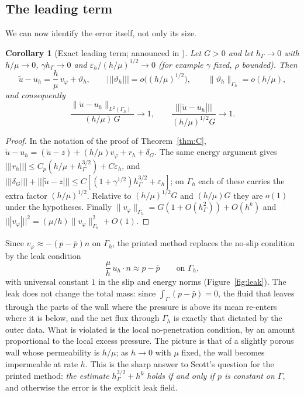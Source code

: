 \documentclass[pdflatex,sn-mathphys-num]{sn-jnl}
\theoremstyle{thmstyleone}
\newtheorem{corollary}[theorem]{Corollary}
\theoremstyle{thmstylethree}
\newcommand{\hG}{h_\Gamma}
\newcommand{\Gh}{\Gamma_h}
\newcommand{\ut}{\tilde u}
\newcommand{\pbar}{\bar p}
\newcommand{\tnorm}[1]{|\!|\!|#1|\!|\!|}
\newcommand{\norm}[1]{\lVert #1\rVert}
\newcommand{\eps}{\varepsilon_h}
\begin{document}
\subsection{The leading term}
We can now identify the error itself, not only its size.

\begin{corollary}[Exact leading term; announced in {\cite{CavalcantePadhiLetter}}]\label{cor:Bp}
Let $G>0$ and let $\hG\to0$ with $h/\mu\to0$, $\gamma\hG\to0$ and $\eps/(h/\mu)^{1/2}\to0$ (for example $\gamma$ fixed, $\rho$ bounded). Then
\[
\ut-u_h=\frac h\mu\,v_\varphi+\vartheta_h,\qquad \tnorm{\vartheta_h}=o\bigl((h/\mu)^{1/2}\bigr),\qquad \norm{\vartheta_h}_{\Gh}=o(h/\mu),
\]
and consequently
\[
\frac{\norm{\ut-u_h}_{L^2(\Gh)}}{(h/\mu)\,G}\longrightarrow1,\qquad\frac{\tnorm{\ut-u_h}}{(h/\mu)^{1/2}G}\longrightarrow1 .
\]
\end{corollary}

\begin{proof}
In the notation of the proof of Theorem~\ref{thm:C}, $\ut-u_h=(\ut-z)+(h/\mu)v_\varphi+r_h+\delta_G$. The same energy argument gives $\tnorm{r_h}\le C_p(h/\mu+\hG^{3/2})+C\eps$, and $\tnorm{\delta_G}+\tnorm{\ut-z}\le C[(1+\gamma^{1/2})\hG^{3/2}+\eps]$; on $\Gh$ each of these carries the extra factor $(h/\mu)^{1/2}$. Relative to $(h/\mu)^{1/2}G$ and $(h/\mu)G$ they are $o(1)$ under the hypotheses. Finally $\norm{v_\varphi}_{\Gh}=G(1+O(\hG^2))+O(h^k)$ and $\tnorm{v_\varphi}^2=(\mu/h)\norm{v_\varphi}^2_{\Gh}+O(1)$.
\end{proof}

Since $v_\varphi\approx-(p-\pbar)n$ on $\Gh$, the printed method replaces the no-slip condition by the leak condition
\[
\frac\mu h\,u_h\cdot n\approx p-\pbar\qquad\text{on }\Gh,
\]
with universal constant $1$ in the slip and energy norms (Figure~\ref{fig:leak}). The leak does not change the total mass: since $\int_\Gamma(p-\pbar)=0$, the fluid that leaves through the parts of the wall where the pressure is above its mean re-enters where it is below, and the net flux through $\Gh$ is exactly that dictated by the outer data. What is violated is the local no-penetration condition, by an amount proportional to the local excess pressure. The picture is that of a slightly porous wall whose permeability is $h/\mu$; as $h\to0$ with $\mu$ fixed, the wall becomes impermeable at rate $h$. This is the sharp answer to Scott's question for the printed method: \emph{the estimate $\hG^{3/2}+h^k$ holds if and only if $p$ is constant on $\Gamma$}, and otherwise the error is the explicit leak field.
\end{document}
